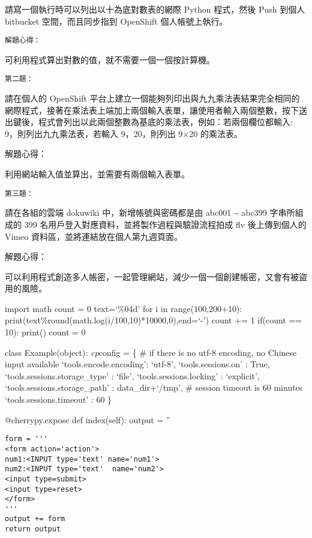 \documentclass[]{article}
\begin{document}
請寫一個執行時可以列出以十為底對數表的網際 Python 程式，然後 Push 到個人
bitbucket 空間，而且同步指到 OpenShift 個人帳號上執行。

\begin{verbatim}
解題心得：
\end{verbatim}

可利用程式算出對數的值，就不需要一個一個按計算機。

\begin{verbatim}
第二題：
\end{verbatim}

請在個人的 OpenShift
平台上建立一個能夠列印出與九九乘法表結果完全相同的網際程式，接著在乘法表上端加上兩個輸入表單，讓使用者輸入兩個整數，按下送出鍵後，程式會列出以此兩個整數為基底的乘法表，例如：若兩個欄位都輸入:
9，則列出九九乘法表，若輸入 9，20，則列出 9×20 的乘法表。

解題心得：

利用網站輸入值並算出，並需要有兩個輸入表單。

\begin{verbatim}
第三題：
\end{verbatim}

請在各組的雲端 dokuwiki 中，新增帳號與密碼都是由 abc001
\textasciitilde{} abc399 字串所組成的 399
名用戶登入對應資料，並將製作過程與驗證流程拍成 flv 後上傳到個人的 Vimeo
資料區，並將連結放在個人第九週頁面。

解題心得：

可以利用程式創造多人帳密，一起管理網站，減少一個一個創建帳密，又會有被盜用的風險。

import math count = 0 text=`\%04d' for i in range(100,200+10):
print(text\%round(math.log(i/100,10)*10000,0),end=`-') count += 1
if(count == 10): print() count = 0

class Example(object): \emph{cp}config = \{ \# if there is no utf-8
encoding, no Chinese input available `tools.encode.encoding': `utf-8',
`tools.sessions.on' : True, `tools.sessions.storage\_type' : `file',
`tools.sessions.locking' : `explicit', `tools.sessions.storage\_path' :
data\_dir+`/tmp', \# session timeout is 60 minutes
`tools.sessions.timeout' : 60 \}

@cherrypy.expose def index(self): output = ''

\begin{verbatim}
form = '''
<form action='action'>
num1:<INPUT type='text' name='num1'>
num2:<INPUT type='text'  name='num2'>
<input type=submit>
<input type=reset>
</form>
'''
output += form
return output
\end{verbatim}
\end{document}

